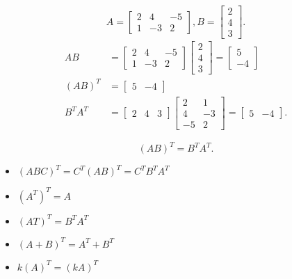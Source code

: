 \documentclass{article}
\begin{document}
\begin{example}
    \[
        A=\begin{bmatrix} 2&4&-5\\1&-3&2 \end{bmatrix},
        B=\begin{bmatrix} 2\\4\\3 \end{bmatrix} 
    .\]
    \begin{align*}
        AB &=
        \begin{bmatrix} 2&4&-5\\1&-3&2 \end{bmatrix}
        \begin{bmatrix} 2\\4\\3 \end{bmatrix}
        =
        \begin{bmatrix} 5\\-4 \end{bmatrix} \\
        (AB)^T &= \begin{bmatrix} 5&-4 \end{bmatrix} \\
        B^TA^T &=
        \begin{bmatrix} 2&4&3 \end{bmatrix} 
        \begin{bmatrix} 2&1\\4&-3\\-5&2 \end{bmatrix} 
        =
        \begin{bmatrix} 5&-4 \end{bmatrix} 
    .\end{align*}
\end{example}

\begin{note}
    \[
        (AB)^T=B^TA^T
    .\] 
\end{note}

\begin{itemize}
    \item $(ABC)^T=C^T(AB)^T=C^TB^TA^T$
    \item $ (A^T)^T=A $
    \item $(AT)^T=B^TA^T$
    \item $(A+B)^T=A^T+B^T$
    \item $ k(A)^T=(kA)^T $
\end{itemize}
\end{document}
